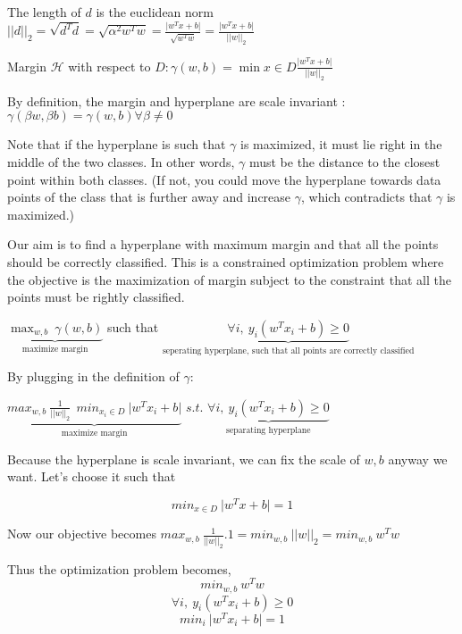 \documentclass[12pt]{article}
\begin{document}
 The length of $d$ is the euclidean norm \\$\vert \vert d \vert \vert_{2} = \sqrt{d^{T}d} = \sqrt{\alpha ^{2}w^{T}w} = \frac{\vert w^{T}x +b \vert}{\sqrt{w^{T}w}} = \frac{\vert w^{T}x + b \vert}{\vert \vert w \vert \vert_{2}}$
 
 Margin $\mathcal{H}$ with respect to $D:\gamma(w,b) = \min{x \in D} \frac{\vert w^{T}x + b \vert }  {\vert \vert w \vert \vert_{2}}$
 
 By definition, the margin and hyperplane are scale invariant : $\gamma(\beta w,\beta b) = \gamma (w,b) \forall \beta \neq 0$
 
 
 Note that if the hyperplane is such that $\gamma$ is maximized, it must lie right in the middle of the two classes. In other words, $\gamma$ must be the distance to the closest point within both classes. (If not, you could move the hyperplane towards data points of the class that is further away and increase $\gamma$, which contradicts that $\gamma$ is maximized.)
 
 
 
 
 Our aim is to find a hyperplane with maximum margin and  that all the points should be  correctly classified. This is a constrained optimization problem where the objective is the maximization of margin subject to the constraint that all the points must  be rightly classified.
 
 $\underbrace{\max_{w,b}  \ \gamma(w,b)}_\text{maximize margin}$ such that $\underbrace{ \forall i, \ y_{i}(w^{T}x_{i} + b) \geq 0}_\text{seperating hyperplane, such that all points are correctly classified}$
 
 
 By plugging in the definition of $\gamma$:
 
 $ \underbrace{max_{w,b} \  \frac{1} {\vert \vert w \vert \vert_{2} } \ \ min _{x_{i} \in D} \  \vert w^{T}x_{i} + b \vert }_\text{maximize margin}$ $s.t.$  $\underbrace{\forall i, \  y_{i}(w^{T}x_{i} + b) \geq 0}_\text{separating hyperplane}$ 
 
 
 Because the hyperplane is scale invariant, we can fix the scale of $w,b$ anyway we want. Let's  choose it such that 
 
 $$min_{x\in D}  \ \vert w^{T}x+b \vert = 1$$
 
 Now our objective becomes $max_{w,b} \  \frac{1} {\vert \vert w \vert \vert_{2}} . 1 = min_{w,b} \ \vert \vert w \vert \vert_{2} = min_{w,b} \  w^{T}w$
 
Thus the optimization problem becomes,
$$min_{w,b} \  w^{T}w$$
$$\forall i, \ y_{i}(w^{T}x_{i} + b) \geq 0$$
$$ min_{i} \  \vert w^{T}x_{i} +b \vert = 1$$ 
\end{document}
